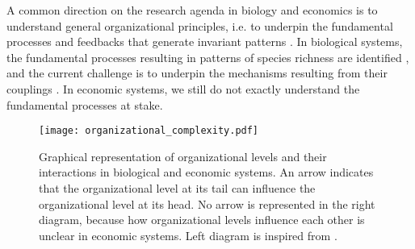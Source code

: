 % 
A common direction on the research agenda in biology and economics is to understand general organizational principles, i.e.  to underpin the fundamental processes and feedbacks that generate invariant patterns \citep{Levin2002,Olff2009,Veldhuis2018}.
% 
In biological systems, the fundamental processes resulting in patterns of species richness are identified \citep{Rahbek2019a,Rangel2018,Hagen2022}, and the current challenge is to underpin the mechanisms resulting from their couplings \citep{Hagen2022}.
% 
In economic systems, we still do not exactly understand the fundamental processes at stake. 
% 
% 
% 

\begin{figure}[ht]
    \centering
    \texttt{[image: organizational\_complexity.pdf]}
\caption{Graphical representation of organizational levels and their interactions in biological and economic systems. An arrow indicates that the organizational level at its tail can influence the organizational level at its head. No arrow is represented in the right diagram, because how organizational levels influence each other is unclear in economic systems. Left diagram is inspired from \cite{Hendry+2016}.}
\label{fig:organisational_levels}
\end{figure}





